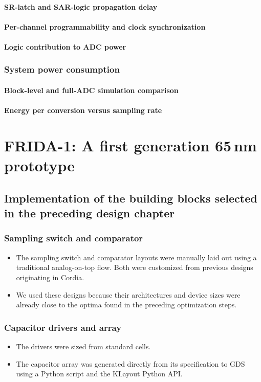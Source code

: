 \documentclass[PhD, UKenglish]{scrbook}
\begin{document}
\subsubsection{SR-latch and SAR-logic propagation delay}
\subsubsection{Per-channel programmability and clock synchronization}
\subsubsection{Logic contribution to ADC power}
\subsection{System power consumption}
\subsubsection{Block-level and full-ADC simulation comparison}
\subsubsection{Energy per conversion versus sampling rate}

\chapter[FRIDA-1: A first generation 65 nm prototype]{FRIDA-1: A first generation 65\,nm prototype}
\section{Implementation of the building blocks selected in the preceding design chapter}
\subsection{Sampling switch and comparator}
\begin{itemize}
  \item The sampling switch and comparator layouts were manually laid out using a traditional analog-on-top flow. Both were customized from previous designs originating in Cordia.
  \item We used these designs because their architectures and device sizes were already close to the optima found in the preceding optimization steps.
\end{itemize}
\subsection{Capacitor drivers and array}
\begin{itemize}
  \item The drivers were sized from standard cells.
  \item The capacitor array was generated directly from its specification to GDS using a Python script and the KLayout Python API.
\end{itemize}
\end{document}

